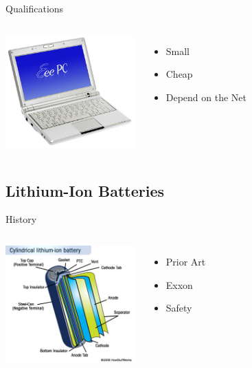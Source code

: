 \documentclass{beamer}
\begin{document}
\begin{frame}{Qualifications}
  \begin{columns}
    \column{5cm}
      \includegraphics[width=5cm]{netbookSpecs.jpg}
    \column{5cm}
      \begin{itemize}
      \item Small
      \item Cheap
      \item Depend on the Net
      \end{itemize}
  \end{columns}
\end{frame}

\subsection{Lithium-Ion Batteries}

\begin{frame}{History}
  \begin{columns}
    \column{5cm}
      \includegraphics[width=5cm]{lionSummary.jpg}
    \column{5cm}
      \begin{itemize}
      \item Prior Art
      \item Exxon %
      \item Safety
      \end{itemize}
  \end{columns}
\end{frame}
\end{document}
